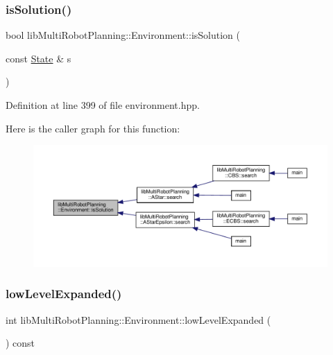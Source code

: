 \subsubsection{\texorpdfstring{is\+Solution()}{isSolution()}}
{\footnotesize\ttfamily bool lib\+Multi\+Robot\+Planning\+::\+Environment\+::is\+Solution (\begin{DoxyParamCaption}\item[{const \hyperlink{structlib_multi_robot_planning_1_1_state}{State} \&}]{s }\end{DoxyParamCaption})\hspace{0.3cm}{\ttfamily [inline]}}



Definition at line 399 of file environment.\+hpp.

Here is the caller graph for this function\+:
\nopagebreak
\begin{figure}[H]
\begin{center}
\leavevmode
\includegraphics[width=350pt]{classlib_multi_robot_planning_1_1_environment_a397c066a4202f0dccbb1346e2e3c8338_icgraph}
\end{center}
\end{figure}
\mbox{\label{classlib_multi_robot_planning_1_1_environment_a9dfe6761bd0b6d25628146cabfc08952}} 
\subsubsection{\texorpdfstring{low\+Level\+Expanded()}{lowLevelExpanded()}}
{\footnotesize\ttfamily int lib\+Multi\+Robot\+Planning\+::\+Environment\+::low\+Level\+Expanded (\begin{DoxyParamCaption}{ }\end{DoxyParamCaption}) const\hspace{0.3cm}{\ttfamily [inline]}}



